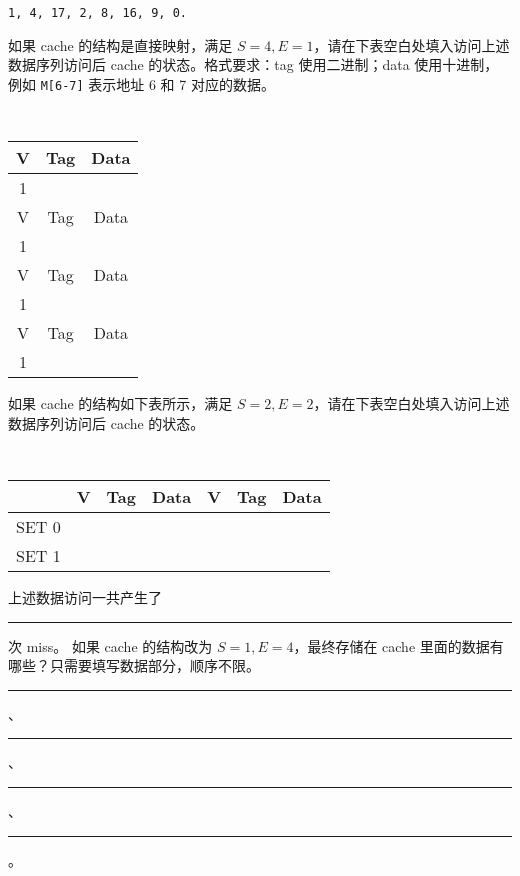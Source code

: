 \begin{problems}
        \begin{center}
            \tt 1, 4, 17, 2, 8, 16, 9, 0.
        \end{center}
        \qn 如果 cache 的结构是直接映射，满足 $S=4, E=1$，请在下表空白处填入访问上述数据序列访问后 cache 的状态。格式要求：tag 使用二进制；data 使用十进制，例如 \verb|M[6-7]| 表示地址 6 和 7 对应的数据。
        \begin{table}[H]
            \tt
            \centering
            \begin{tabular}{|c|c|c|}
                \hline
                V & {\qquad \qquad Tag \qquad \qquad} & {\qquad \qquad Data \qquad \qquad} \\ \hline
                1 &  &  \\ \hline \hline
                V & Tag & Data \\ \hline
                1 &  &  \\ \hline \hline
                V & Tag & Data \\ \hline
                1 &  &  \\ \hline \hline
                V & Tag & Data \\ \hline
                1 &  &  \\ \hline
            \end{tabular}
        \end{table}
        \qn 如果 cache 的结构如下表所示，满足 $S=2, E=2$，请在下表空白处填入访问上述数据序列访问后 cache 的状态。
        \begin{table}[H]
            \tt
            \centering
            \begin{tabular}{|c|c|c|c|c|c|c|}
                \hline
                & {\quad V \quad} & {\quad Tag \quad} & {\quad Data \quad} & {\quad V \quad} & {\quad Tag \quad} & {\quad Data \quad} \\ \hline
                SET 0 &  &  &  &  &  &  \\ \hline
                SET 1 &  &  &  &  &  &  \\ \hline
            \end{tabular}
        \end{table}
        上述数据访问一共产生了 \rule{2.5cm}{0.25mm} 次 miss。
        \qn 如果 cache 的结构改为 $S=1, E=4$，最终存储在 cache 里面的数据有哪些？只需要填写数据部分，顺序不限。
        \begin{center}
            \rule{2.5cm}{0.25mm}、\quad \rule{2.5cm}{0.25mm}、\quad \rule{2.5cm}{0.25mm}、\quad \rule{2.5cm}{0.25mm}。
        \end{center}
    \end{problems}